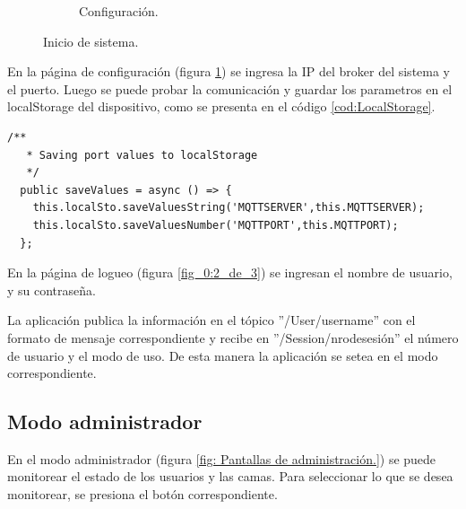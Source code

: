 \begin{figure}[!htpb]
\begin{subfigure}[b]{0.3\textwidth}
         \caption{Configuración.}
         \label{fig_0:3_de_3}
     \end{subfigure}
        \caption{Inicio de sistema.}
        \label{fig:Pantalla inicial, configuración y acceso de la aplicación.}
\end{figure}

En la página de configuración (figura \ref{fig_0:3_de_3}) se ingresa la IP del broker del sistema y el puerto. Luego se puede probar la comunicación y guardar los parametros en el localStorage del dispositivo, como se presenta en el código \ref{cod:LocalStorage}.

\begin{lstlisting}[label=cod:LocalStorage,caption=  Funciones del servicio que guardan en el localStorage.]
  /**
   * Saving port values to localStorage
   */
  public saveValues = async () => {     
    this.localSto.saveValuesString('MQTTSERVER',this.MQTTSERVER);
    this.localSto.saveValuesNumber('MQTTPORT',this.MQTTPORT);
  };
\end{lstlisting}

En la página de logueo (figura \ref{fig_0:2_de_3}) se ingresan el nombre de usuario, y su contraseña.

La aplicación publica la información en el tópico ''/User/username'' con el formato de mensaje correspondiente y recibe en ''/Session/nrodesesión'' el número de usuario y el modo de uso. De esta manera la aplicación se setea en el modo correspondiente.



\subsection{Modo administrador}
En el modo administrador (figura \ref{fig: Pantallas de administración.}) se puede monitorear el estado de los usuarios y las camas. Para seleccionar lo que se desea monitorear, se presiona el botón correspondiente.

